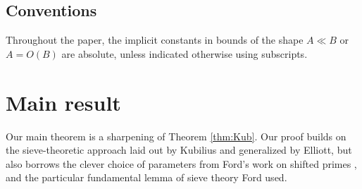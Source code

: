 \documentclass{article}
\theoremstyle{plain}
\theoremstyle{remark}
\numberwithin{equation}{section}
\begin{document}
\subsection*{Conventions}
Throughout the paper, the implicit constants in bounds of the shape $A\ll B$ or $A=O(B)$ are absolute, unless indicated otherwise using subscripts.
\section{Main result}
Our main theorem is a sharpening of Theorem \ref{thm:Kub}. Our proof builds on the sieve-theoretic approach laid out by Kubilius and generalized by Elliott, but also borrows the clever choice of parameters from Ford's work on shifted primes \cite{FordShifted}, and the particular fundamental lemma of sieve theory Ford used. 
\end{document}
